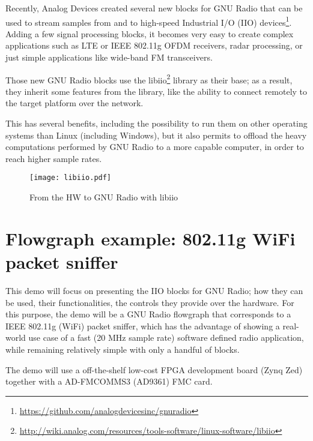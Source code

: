 \documentclass{acm_proc_article-sp}
\begin{document}
Recently, Analog Devices created several new blocks for GNU Radio that can be
used to stream samples from and to high-speed Industrial I/O (IIO)
devices\footnote{ \url{https://github.com/analogdevicesinc/gnuradio}}.
Adding a few signal processing
blocks, it becomes very easy to create complex applications such as
LTE or IEEE 802.11g OFDM receivers, radar processing, or just simple
applications like wide-band FM transceivers.

Those new GNU Radio blocks use the
libiio\footnote{ \url{http://wiki.analog.com/resources/tools-software/linux-software/libiio}}
library as their base; as a result,
they inherit some features from the library, like the ability to connect
remotely to the target platform over the network.

This has several benefits, including the possibility to run them on other
operating systems than Linux (including Windows), but it also permits to
offload the heavy computations performed by GNU Radio to a more capable computer,
in order to reach higher sample rates.

\begin{figure}[htbp]
\centering
\texttt{[image: libiio.pdf]}
\caption{From the HW to GNU Radio with libiio}
\end{figure}

\section{Flowgraph example: 802.11g WiFi packet sniffer}

This demo will focus on presenting the IIO blocks for GNU Radio; how they can be
used, their functionalities, the controls they provide over the hardware.
For this purpose, the demo will be a GNU Radio flowgraph that corresponds to a
IEEE 802.11g (WiFi) packet sniffer, which has the advantage of showing a
real-world use case of a fast (20 MHz sample rate) software defined radio
application, while remaining relatively simple with only a handful of blocks.

The demo will use a off-the-shelf low-cost FPGA development board (Zynq Zed)
together with a AD-FMCOMMS3 (AD9361) FMC card.

\balancecolumns
\end{document}
